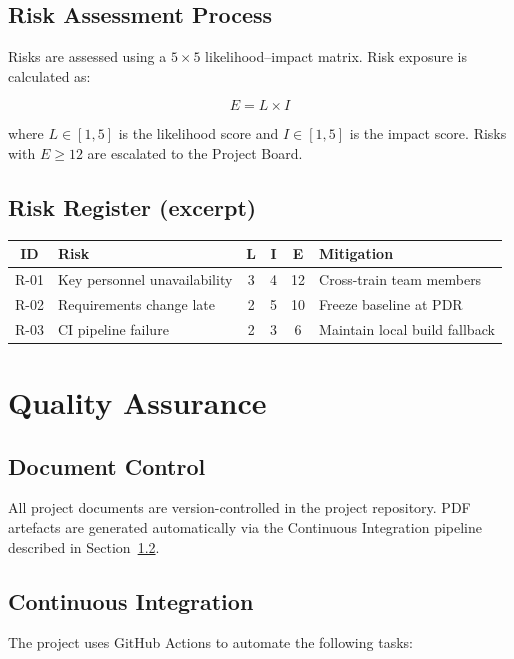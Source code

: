 \documentclass[12pt,a4paper]{article}
\begin{document}
\subsection{Risk Assessment Process}
Risks are assessed using a $5 \times 5$ likelihood--impact matrix.
Risk exposure is calculated as:

\begin{equation}
  E = L \times I
\end{equation}

\noindent where $L \in [1,5]$ is the likelihood score and $I \in [1,5]$ is
the impact score.  Risks with $E \geq 12$ are escalated to the Project Board.

\subsection{Risk Register (excerpt)}
\begin{tabularx}{\textwidth}{|c|X|c|c|c|X|}
  \hline
  \rowcolor{lightgray}
  \textbf{ID} & \textbf{Risk} & \textbf{L} & \textbf{I} & \textbf{E} & \textbf{Mitigation} \\
  \hline
  R-01 & Key personnel unavailability & 3 & 4 & 12 & Cross-train team members \\
  R-02 & Requirements change late     & 2 & 5 & 10 & Freeze baseline at PDR \\
  R-03 & CI pipeline failure          & 2 & 3 &  6 & Maintain local build fallback \\
  \hline
\end{tabularx}

\section{Quality Assurance}

\subsection{Document Control}
All project documents are version-controlled in the project repository.
PDF artefacts are generated automatically via the Continuous Integration
pipeline described in Section~\ref{sec:ci}.

\subsection{Continuous Integration}\label{sec:ci}
The project uses GitHub Actions to automate the following tasks:
\end{document}
